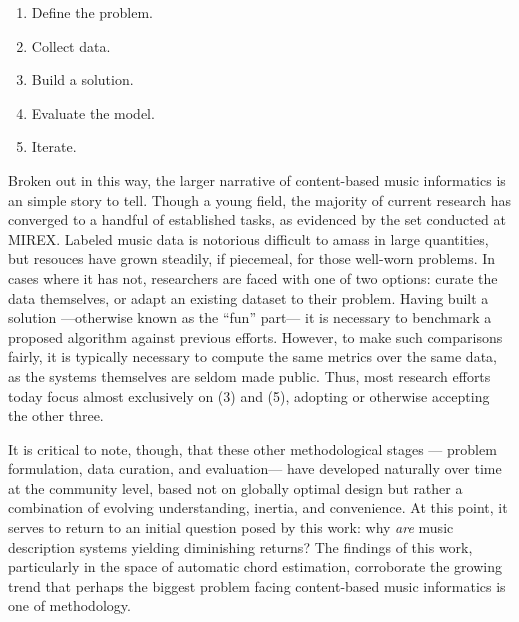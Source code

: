 \begin{enumerate}
\item Define the problem.
\item Collect data.
\item Build a solution.
\item Evaluate the model.
\item Iterate.
\end{enumerate}


Broken out in this way, the larger narrative of content-based music informatics is an simple story to tell.
Though a young field, the majority of current research has converged to a handful of established tasks, as evidenced by the set conducted at MIREX.
Labeled music data is notorious difficult to amass in large quantities, but resouces have grown steadily, if piecemeal, for those well-worn problems.
In cases where it has not, researchers are faced with one of two options:
curate the data themselves, or adapt an existing dataset to their problem.
Having built a solution ---otherwise known as the ``fun'' part--- it is necessary to benchmark a proposed algorithm against previous efforts.
However, to make such comparisons fairly, it is typically necessary to compute the same metrics over the same data, as the systems themselves are seldom made public.
Thus, most research efforts today focus almost exclusively on (3) and (5), adopting or otherwise accepting the other three.

It is critical to note, though, that these other methodological stages --- problem formulation, data curation, and evaluation--- have developed naturally over time at the community level, based not on globally optimal design but rather a combination of evolving understanding, inertia, and convenience.
At this point, it serves to return to an initial question posed by this work:
why \emph{are} music description systems yielding diminishing returns?
The findings of this work, particularly in the space of automatic chord estimation, corroborate the growing trend that perhaps the biggest problem facing content-based music informatics is one of methodology.

